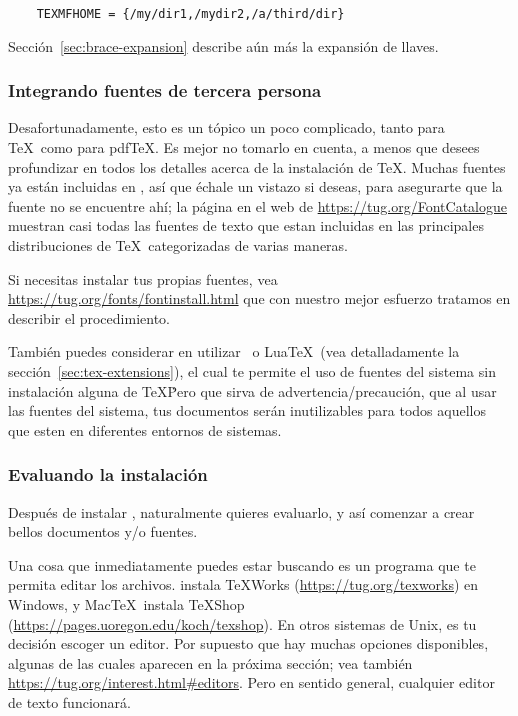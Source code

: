 \documentclass{article}
\begin{document}
\begin{verbatim}
	TEXMFHOME = {/my/dir1,/mydir2,/a/third/dir}
\end{verbatim}

Sección~\ref{sec:brace-expansion} describe aún más la expansión de llaves. 

\subsubsection{Integrando fuentes de tercera persona}

Desafortunadamente, esto es un tópico un poco complicado, tanto para \TeX\ como para pdf\TeX{}. Es mejor no
tomarlo en cuenta, a menos que desees profundizar en todos los
detalles acerca de la instalación de \TeX{}. Muchas fuentes ya están
incluidas en \TL, así que échale un vistazo si deseas, para asegurarte que la fuente no se encuentre ahí; la página en el web de \url{https://tug.org/FontCatalogue} muestran casi todas las fuentes de texto que estan incluidas en las principales distribuciones de \TeX\, categorizadas de varias maneras.
 
Si necesitas instalar tus propias fuentes, vea
\url{https://tug.org/fonts/fontinstall.html} que con nuestro mejor esfuerzo tratamos en describir el procedimiento.
  
También puedes considerar en utilizar \XeTeX\ o Lua\TeX\ (vea detalladamente la sección~\ref{sec:tex-extensions}), el cual te permite el uso de fuentes del sistema sin instalación alguna de \TeX\. Pero que sirva de advertencia/precaución, que al usar las fuentes del sistema, tus documentos serán inutilizables para todos aquellos que esten en diferentes entornos de sistemas. 
   
\subsubsection{Evaluando la instalación}
\label{sec:test-install}

Después de instalar \TL{}, naturalmente quieres evaluarlo, y así
comenzar a crear bellos documentos y\slash o fuentes. 

Una cosa que inmediatamente puedes estar buscando es un programa que te
permita editar los archivos. \TL{} instala \TeX{}Works
(\url{https://tug.org/texworks}) en Windows, y Mac\TeX\ instala TeXShop
(\url{https://pages.uoregon.edu/koch/texshop}). En otros sistemas de
Unix, es tu decisión escoger un editor. Por supuesto que hay muchas
opciones disponibles, algunas de las cuales aparecen en la próxima
sección; vea también \url{https://tug.org/interest.html#editors}. Pero
en sentido general, cualquier editor de texto funcionará.
\end{document}
